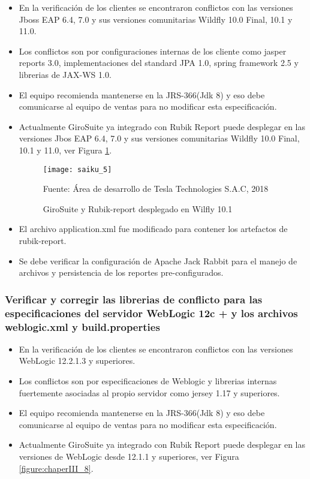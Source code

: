 \begin{spacing}{1.5}
		\begin{itemize}
			\item En la verificaci\'{o}n de los clientes se encontraron conflictos con las versiones Jboss EAP 6.4, 7.0 y sus versiones comunitarias Wildfly 10.0 Final, 10.1 y 11.0.
			\item Los conflictos son por configuraciones internas de los cliente como jasper reports 3.0, implementaciones del standard JPA 1.0, spring framework 2.5 y librerias de JAX-WS 1.0.
			\item El equipo recomienda mantenerse en la JRS-366(Jdk 8) y eso debe comunicarse al equipo de ventas para no modificar esta especificaci\'{o}n.
			\item Actualmente GiroSuite ya integrado con Rubik Report puede desplegar en las versiones Jbos EAP 6.4, 7.0 y sus versiones comunitarias Wildfly 10.0 Final, 10.1 y 11.0, ver Figura \ref{figure:chaperIII_7}.
			\begin{figure}[H]
				\centering
				\texttt{[image: saiku\_5]}
				\caption {\centering \small{GiroSuite y Rubik-report desplegado en Wilfly 10.1}} \label{figure:chaperIII_7}
				\small {Fuente: \'{A}rea de desarrollo de Tesla Technologies S.A.C, 2018}
			\end{figure}
			
			\item El archivo application.xml fue modificado para contener los artefactos de rubik-report.
			\item Se debe verificar la configuraci\'{o}n de Apache Jack Rabbit para el manejo de archivos y persistencia de los reportes pre-configurados.
		\end{itemize}
		\subsubsection{Verificar y corregir las librerias de conflicto para las especificaciones del servidor WebLogic 12c + y los archivos weblogic.xml y build.properties}
			\begin{itemize}
				\item En la verificaci\'{o}n de los clientes se encontraron conflictos con las versiones WebLogic 12.2.1.3 y superiores.
				\item Los conflictos son por especificaciones de Weblogic y librerias internas fuertemente asociadas al propio servidor como jersey 1.17 y superiores.
				\item El equipo recomienda mantenerse en la JRS-366(Jdk 8) y eso debe comunicarse al equipo de ventas para no modificar esta especificaci\'{o}n.
				\item Actualmente GiroSuite ya integrado con Rubik Report puede desplegar en las versiones de WebLogic desde 12.1.1 y superiores, ver Figura \ref{figure:chaperIII_8}.
				

\end{itemize}
\end{spacing}
